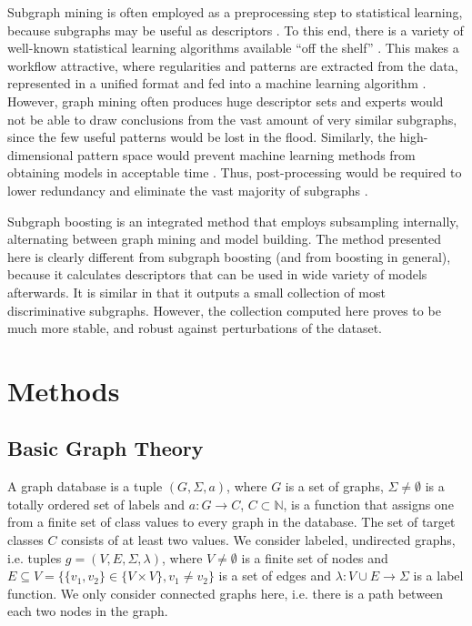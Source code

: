 \documentclass{article}
\begin{document}
Subgraph mining is often employed as a preprocessing step to statistical
learning, because subgraphs may be useful as descriptors
\cite{bringmann10lego,schietgat09mcsfeatures}. To this end, there is a variety
of well-known statistical learning algorithms available ``off the shelf''
\cite{hall09weka,r08language}. This makes a workflow attractive, where
regularities and patterns are extracted from the data, represented in a unified
format and fed into a machine learning algorithm \cite{hkr03molfea}.  However,
graph mining often produces huge descriptor sets and experts would not be
able to draw conclusions from the vast amount of very similar subgraphs, since
the few useful patterns would be lost in the flood.  Similarly, the
high-dimensional pattern space would prevent machine learning methods from
obtaining models in acceptable time \cite{Hasan_origami:mining}.  Thus,
post-processing would be required to lower redundancy and eliminate the vast
majority of subgraphs \cite{schietgat09mcsfeatures, CMNK01Frequent, Jun04Spin}. 

Subgraph boosting \cite{saigo09gboost} is an integrated method that employs
subsampling internally, alternating between graph mining and model building.
The method presented here is clearly different from subgraph boosting (and from
boosting in general), because it calculates descriptors that can be used in
wide variety of models afterwards. It is similar in that it outputs a small
collection of most discriminative subgraphs. However, the collection computed
here proves to be much more stable, and robust against perturbations of the
dataset.



\section{Methods}
\label{s:Methods}

\subsection{Basic Graph Theory}
\label{ss:BasicGraphTheory}
A graph database is a tuple $(G, \Sigma, a)$, where $G$ is a set of graphs,
$\Sigma \ne \emptyset$  is a totally ordered set of labels and $a: G
\rightarrow C$, $C \subset \mathbb{N}$, is a function that assigns one from a
finite set of class values to every graph in the database.  The set of target
classes $C$ consists of at least two values.  We consider labeled, undirected
graphs, i.e. tuples $g=(V,E,\Sigma,\lambda)$, where $V\ne \emptyset$ is a
finite set of nodes and $E \subseteq V = \{\{v_1, v_2\} \in \{V \times V\}, v_1
\ne v_2\}$ is a set of edges and $\lambda: V\cup E \rightarrow \Sigma$ is a
label function.  We only consider connected graphs here, i.e.  there is a path
between each two nodes in the graph.
\end{document}
